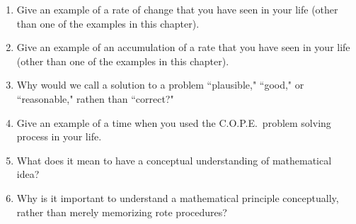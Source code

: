 \begin{enumerate}

    \item Give an example of a rate of change that you have seen in your life (other than one of the examples in this chapter).

    \item Give an example of an accumulation of a rate that you have seen in your life (other than one of the examples in this chapter).

    \item Why would we call a solution to a problem ``plausible," ``good," or ``reasonable," rathen than ``correct?"

    \item Give an example of a time when you used the C.O.P.E.\ problem solving process in your life.

    \item What does it mean to have a conceptual understanding of mathematical idea?

    \item Why is it important to understand a mathematical principle conceptually, rather than merely memorizing rote procedures?

\end{enumerate}

%
